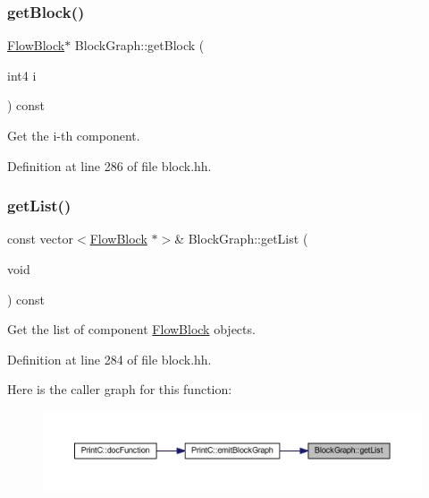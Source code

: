 \subsubsection{\texorpdfstring{getBlock()}{getBlock()}}
{\footnotesize\ttfamily \mbox{\hyperlink{class_flow_block}{Flow\+Block}}$\ast$ Block\+Graph\+::get\+Block (\begin{DoxyParamCaption}\item[{int4}]{i }\end{DoxyParamCaption}) const\hspace{0.3cm}{\ttfamily [inline]}}



Get the i-\/th component. 



Definition at line 286 of file block.\+hh.

\mbox{\label{class_block_graph_a48c7e5338645dcbc38521bf1722dd728}} 
\subsubsection{\texorpdfstring{getList()}{getList()}}
{\footnotesize\ttfamily const vector$<$\mbox{\hyperlink{class_flow_block}{Flow\+Block}} $\ast$$>$\& Block\+Graph\+::get\+List (\begin{DoxyParamCaption}\item[{void}]{ }\end{DoxyParamCaption}) const\hspace{0.3cm}{\ttfamily [inline]}}



Get the list of component \mbox{\hyperlink{class_flow_block}{Flow\+Block}} objects. 



Definition at line 284 of file block.\+hh.

Here is the caller graph for this function\+:
\nopagebreak
\begin{figure}[H]
\begin{center}
\leavevmode
\includegraphics[width=350pt]{class_block_graph_a48c7e5338645dcbc38521bf1722dd728_icgraph}
\end{center}
\end{figure}
\mbox{\label{class_block_graph_a12bc7480ffcc4c163a2a2cd800742f09}} 
